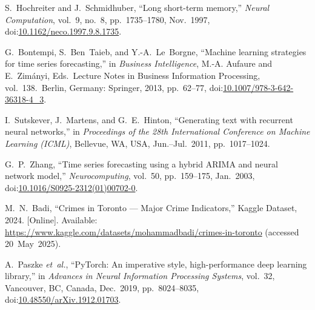 \documentclass[conference]{IEEEtran}
\begin{document}
\begin{thebibliography}{00}
S.~Hochreiter and J.~Schmidhuber, ``Long short-term memory,'' \emph{Neural
  Computation}, vol.~9, no.~8, pp.~1735--1780, Nov.\ 1997,
  doi:\href{https://doi.org/10.1162/neco.1997.9.8.1735}{10.1162/neco.1997.9.8.1735}.

G.~Bontempi, S.~Ben~Taieb, and Y.-A.~Le~Borgne, ``Machine learning strategies
  for time series forecasting,'' in \emph{Business Intelligence}, M.-A.
  Aufaure and E.~Zimányi, Eds.\ Lecture Notes in Business Information
  Processing, vol.\ 138.\ Berlin, Germany: Springer, 2013, pp.~62--77,
  doi:\href{https://doi.org/10.1007/978-3-642-36318-4_3}{10.1007/978-3-642-36318-4\_3}.

I.~Sutskever, J.~Martens, and G.~E.~Hinton, ``Generating text with recurrent
  neural networks,'' in \emph{Proceedings of the 28th International Conference
  on Machine Learning (ICML)}, Bellevue, WA, USA, Jun.--Jul.\ 2011,
  pp.~1017--1024.


G.~P.~Zhang, ``Time series forecasting using a hybrid {ARIMA} and neural
  network model,'' \emph{Neurocomputing}, vol.~50, pp.~159--175, Jan.\ 2003,
  doi:\href{https://doi.org/10.1016/S0925-2312(01)00702-0}{10.1016/S0925-2312(01)00702-0}.

M.~N.~Badi, ``Crimes in Toronto — Major Crime Indicators,'' Kaggle Dataset,
  2024. [Online]. Available: \url{https://www.kaggle.com/datasets/mohammadbadi/crimes-in-toronto}
  (accessed 20~May~2025).

A.~Paszke \emph{et~al.}, ``PyTorch: An imperative style, high-performance deep
  learning library,'' in \emph{Advances in Neural Information Processing
  Systems}, vol.~32, Vancouver, BC, Canada, Dec.\ 2019, pp.~8024--8035,
  doi:\href{https://doi.org/10.48550/arXiv.1912.01703}{10.48550/arXiv.1912.01703}.

\end{thebibliography}
\end{document}
